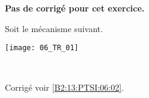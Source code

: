\normaltrue
\correctionfalse


\setcounter{question}{0}
\ifcorrection
\else
\textbf{Pas de corrigé pour cet exercice.}
\fi

\ifprof
\else
Soit le mécanisme suivant. 
\begin{center}
\texttt{[image: 06\_TR\_01]}
\end{center}
\fi

\ifprof ~\\

\else
\fi

\ifprof
\else
\footnotesize

\normalsize
\begin{flushright}
\footnotesize{Corrigé  voir \ref{B2:13:PTSI:06:02}.}
\end{flushright}%
\fi
